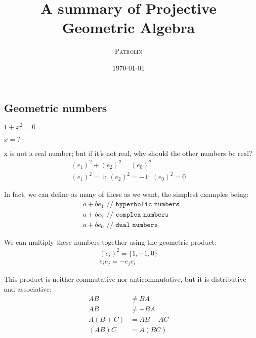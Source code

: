 \documentclass[twoside]{article}
\title{A summary of Projective Geometric Algebra}
\author{\textsc{Patrolin}}
\date{\today}
\newcommand{\T}[1]{\textrm{#1}} %
\newcommand{\B}[1]{\left(#1\right)} %
\begin{document}
    \maketitle
    \thispagestyle{empty}

    \begin{multicols*}{2}
        \section{Geometric numbers}
            \centerline{$ 1 + x^2 = 0 $}
            \centerline{$ x = \T{?} $}\vspace{5px}
            \par
                x is not a real number; but if it's not real, why should the other numbers be real?
                \begin{gather*}
                    \B{e_1}^2 + \B{e_2}^2 = \B{e_0}^2 \\
                    \B{e_1}^2 = 1;\, \B{e_2}^2 = -1;\, \B{e_0}^2 = 0
                \end{gather*}
            \par
                In fact, we can define as many of these as we want, the simplest examples being:
                $$\begin{aligned}
                    &a + b e_1 \texttt{ // hyperbolic numbers} \\
                    &a + b e_2 \texttt{ // complex numbers} \\
                    &a + b e_0 \texttt{ // dual numbers}
                \end{aligned}$$
            \par
                We can multiply these numbers together using the geometric product:
                \begin{gather*}
                    \B{e_i}^2 = \{1, -1, 0\} \\
                    e_i e_j = -e_j e_i
                \end{gather*}
            \par
                This product is neither commutative nor anticommutative, but it is distributive and associative:
                $$\begin{aligned}
                    AB &\neq BA \\
                    AB &\neq -BA \\
                    A(B+C) &= AB + AC \\
                    (AB)C &= A(BC) \\

\end{aligned}$$
\end{multicols*}
\end{document}
